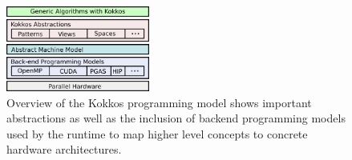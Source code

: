 \begin{figure}[t!]
\centerline{\includegraphics[width=0.42\textwidth]{img/Stack.png}}
\caption{Overview of the Kokkos programming model shows important abstractions as well as the inclusion of backend programming models used by the runtime to map higher level concepts to concrete hardware architectures.}
\label{fig:stack}
\end{figure}


